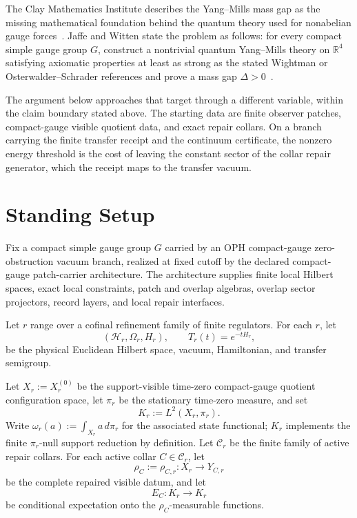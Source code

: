 \documentclass[11pt]{article}
\numberwithin{equation}{section}
\theoremstyle{remark}
\newcommand{\Hcal}{\mathcal H}
\newcommand{\R}{\mathbb R}
\begin{document}
The Clay Mathematics Institute describes the Yang--Mills mass gap as the missing mathematical
foundation behind the quantum theory used for nonabelian gauge forces~\cite{clay}. Jaffe and
Witten state the problem as follows: for every compact simple gauge group \(G\), construct a
nontrivial quantum Yang--Mills theory on \(\R^4\) satisfying axiomatic properties at least as
strong as the stated Wightman or Osterwalder--Schrader references and prove a mass gap
\(\Delta>0\)~\cite{jaffe-witten,clay-mpp}.

The argument below approaches that target through a different variable, within the claim boundary stated above. The starting data are finite observer patches,
compact-gauge visible quotient data, and exact repair collars. On a branch carrying the finite
transfer receipt and the continuum certificate, the nonzero energy threshold is the cost of leaving
the constant sector of the collar repair generator, which the receipt maps to the transfer vacuum.

\section{Standing Setup}

Fix a compact simple gauge group \(G\) carried by an OPH compact-gauge zero-obstruction vacuum
branch, realized at fixed cutoff by the declared compact-gauge patch-carrier architecture. The
architecture supplies finite local Hilbert spaces, exact local constraints, patch and overlap
algebras, overlap sector projectors, record layers, and local repair interfaces.

Let \(r\) range over a cofinal refinement family of finite regulators. For each \(r\), let
\[
(\Hcal_r,\Omega_r,H_r),
\qquad
T_r(t)=e^{-tH_r},
\]
be the physical Euclidean Hilbert space, vacuum, Hamiltonian, and transfer semigroup.

Let \(X_r:=X_r^{(0)}\) be the support-visible time-zero compact-gauge quotient configuration
space, let \(\pi_r\) be the stationary time-zero measure, and set
\[
K_r:=L^2(X_r,\pi_r).
\]
Write \(\omega_r(a):=\int_{X_r}a\,d\pi_r\) for the associated state functional; \(K_r\)
implements the finite \(\pi_r\)-null support reduction by definition.
Let \(\mathcal C_r\) be the finite family of active repair collars. For each active collar
\(C\in\mathcal C_r\), let
\[
\rho_C:=\rho_{C,r}:X_r\to Y_{C,r}
\]
be the complete repaired visible datum, and let
\[
E_C:K_r\to K_r
\]
be conditional expectation onto the \(\rho_C\)-measurable functions.
\end{document}
